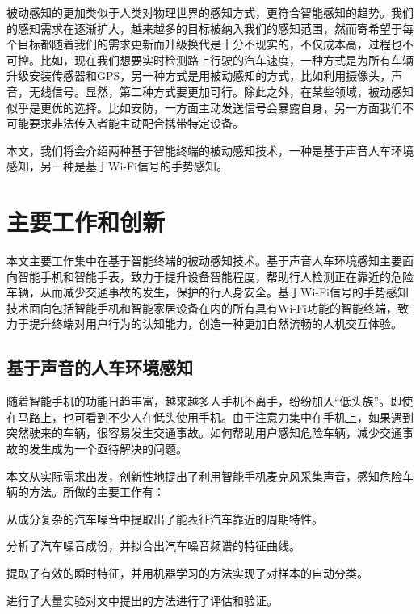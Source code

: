 
被动感知的更加类似于人类对物理世界的感知方式，更符合智能感知的趋势。我们的感知需求在逐渐扩大，越来越多的目标被纳入我们的感知范围，然而寄希望于每个目标都随着我们的需求更新而升级换代是十分不现实的，不仅成本高，过程也不可控。比如，现在我们想要实时检测路上行驶的汽车速度，一种方式是为所有车辆升级安装传感器和GPS，另一种方式是用被动感知的方式，比如利用摄像头，声音，无线信号。显然，第二种方式要更加可行。除此之外，在某些领域，被动感知似乎是更优的选择。比如安防，一方面主动发送信号会暴露自身，另一方面我们不可能要求非法传入者能主动配合携带特定设备。%

本文，我们将会介绍两种基于智能终端的被动感知技术，一种是基于声音人车环境感知，另一种是基于Wi-Fi信号的手势感知。

\section{主要工作和创新}

本文主要工作集中在基于智能终端的被动感知技术。基于声音人车环境感知主要面向智能手机和智能手表，致力于提升设备智能程度，帮助行人检测正在靠近的危险车辆，从而减少交通事故的发生，保护的行人身安全。基于Wi-Fi信号的手势感知技术面向包括智能手机和智能家居设备在内的所有具有Wi-Fi功能的智能终端，致力于提升终端对用户行为的认知能力，创造一种更加自然流畅的人机交互体验。

\subsection{基于声音的人车环境感知}

随着智能手机的功能日趋丰富，越来越多人手机不离手，纷纷加入“低头族”。即使在马路上，也可看到不少人在低头使用手机。由于注意力集中在手机上，如果遇到突然驶来的车辆，很容易发生交通事故。如何帮助用户感知危险车辆，减少交通事故的发生成为一个亟待解决的问题。

本文从实际需求出发，创新性地提出了利用智能手机麦克风采集声音，感知危险车辆的方法。所做的主要工作有：
\begin{compactenum}
\item 从成分复杂的汽车噪音中提取出了能表征汽车靠近的周期特性。
\item 分析了汽车噪音成份，并拟合出汽车噪音频谱的特征曲线。
\item 提取了有效的瞬时特征，并用机器学习的方法实现了对样本的自动分类。
\item 进行了大量实验对文中提出的方法进行了评估和验证。
\end{compactenum}

